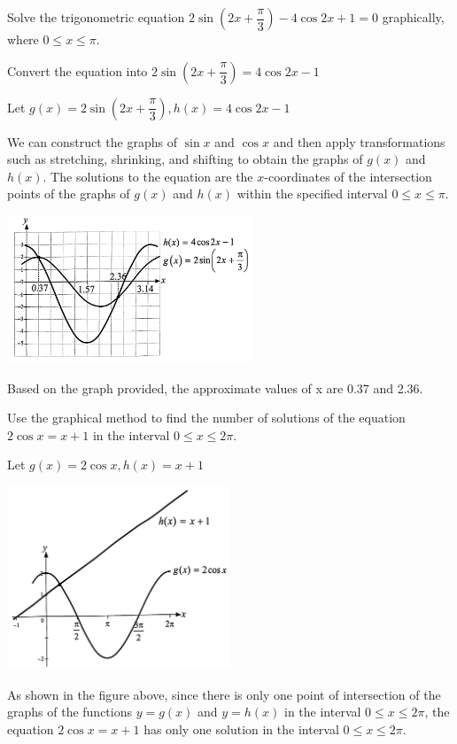 \documentclass{report}
\begin{document}
\begin{question}
	Solve the trigonometric equation $2 \sin \left(2 x+\dfrac{\pi}{3}\right)-4 \cos 2 x+1=0$ graphically, where $0 \leq x \leq \pi$.
	
	\sol{}
	
	\noindent Convert the equation into $2 \sin \left(2 x+\dfrac{\pi}{3}\right)=4 \cos 2 x-1$
	
	\noindent Let $g(x)=2 \sin \left(2 x+\dfrac{\pi}{3}\right), h(x)=4 \cos 2 x-1$
	
	\noindent We can construct the graphs of $\sin x$ and $\cos x$ and then apply transformations such as stretching, shrinking, and shifting to obtain the graphs of $g(x)$ and $h(x)$. The solutions to the equation are the $x$-coordinates of the intersection points of the graphs of $g(x)$ and $h(x)$ within the specified interval $0\leq x\leq \pi$.
	\begin{center}
		\includegraphics[width=0.55\textwidth]{assets/11-17.jpg}
	\end{center}
	\vspace{-1em}
	Based on the graph provided, the approximate values of x are 0.37 and 2.36.
\end{question}

\begin{question}
	Use the graphical method to find the number of solutions of the equation $2\cos x = x + 1$ in the interval $0 \leq x \leq 2\pi$.
	
	\sol{}
	
	\noindent Let $g(x) = 2\cos x, h(x) = x + 1$
	\vspace{-2em}
	\begin{center}
		\includegraphics[width=0.5\textwidth]{assets/11-18.jpg}
	\end{center}
	\vspace{-2em}
	As shown in the figure above, since there is only one point of intersection of the graphs of the functions $y = g(x)$ and $y = h(x)$ in the interval $0 \leq x \leq 2\pi$, the equation $2\cos x = x + 1$ has only one solution in the interval $0 \leq x \leq 2\pi$.
\end{question}
\end{document}
